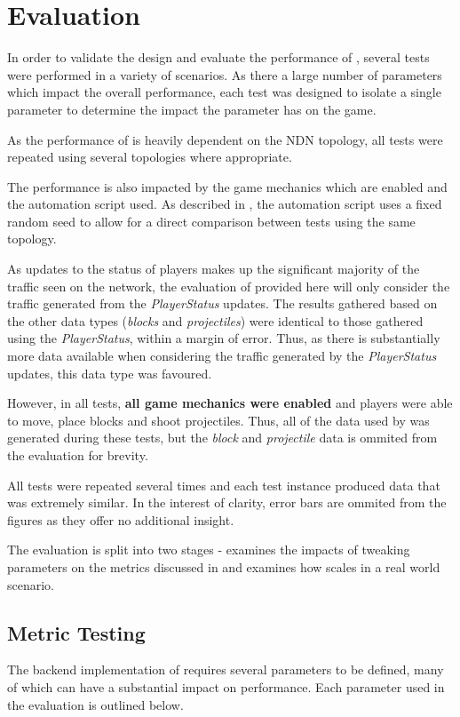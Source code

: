 \chapter{Evaluation}\label{eval}
In order to validate the design and evaluate the performance of \game{}, several tests were performed in a variety of scenarios. As there a large number of parameters which impact the overall performance, each test was designed to isolate a single parameter to determine the impact the parameter has on the game.

As the performance of \game{} is heavily dependent on the NDN topology, all tests were repeated using several topologies where appropriate.

The performance is also impacted by the game mechanics which are enabled and the automation script used. As described in , the automation script uses a fixed random seed to allow for a direct comparison between tests using the same topology.

As updates to the status of players makes up the significant majority of the traffic seen on the network, the evaluation of \game{} provided here will only consider the traffic generated from the \textit{PlayerStatus} updates. The results gathered based on the other data types (\textit{blocks} and \textit{projectiles}) were identical to those gathered using the \textit{PlayerStatus}, within a margin of error. Thus, as there is substantially more data available when considering the traffic generated by the \textit{PlayerStatus} updates, this data type was favoured. 

However, in all tests, \textbf{all game mechanics were enabled} and players were able to move, place blocks and shoot projectiles. Thus, all of the data used by \game{} was generated during these tests, but the \textit{block} and \textit{projectile} data is ommited from the evaluation for brevity.  

All tests were repeated several times and each test instance produced data that was extremely similar. In the interest of clarity, error bars are ommited from the figures as they offer no additional insight.

The evaluation is split into two stages -  examines the impacts of tweaking parameters on the metrics discussed in  and  examines how \game{} scales in a real world scenario.


\section{Metric Testing}\label{sec:eval:metrics-testing}
The backend implementation of \game{} requires several parameters to be defined, many of which can have a substantial impact on performance. Each parameter used in the evaluation is outlined below.

